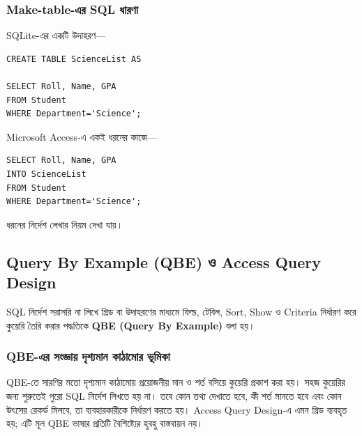 \subsubsection{Make-table-এর SQL ধারণা}

SQLite-এর একটি উদাহরণ—

\par\noindent\begin{minipage}{\linewidth}
\begin{verbatim}
CREATE TABLE ScienceList AS

SELECT Roll, Name, GPA
FROM Student
WHERE Department='Science';
\end{verbatim}
\end{minipage}\par

Microsoft Access-এ একই ধরনের কাজে—

\par\noindent\begin{minipage}{\linewidth}
\begin{verbatim}
SELECT Roll, Name, GPA
INTO ScienceList
FROM Student
WHERE Department='Science';
\end{verbatim}
\end{minipage}\par

ধরনের নির্দেশ লেখার নিয়ম দেখা যায়।

\subsection{Query By Example (QBE) ও Access Query Design}

\begin{definitionbox}{}

SQL নির্দেশ সরাসরি না লিখে গ্রিড বা উদাহরণের মাধ্যমে
ফিল্ড, টেবিল, Sort, Show ও Criteria নির্ধারণ করে কুয়েরি তৈরি করার
পদ্ধতিকে \textbf{QBE (Query By Example)} বলা হয়।

\end{definitionbox}

\subsubsection{QBE-এর সংজ্ঞায় দৃশ্যমান কাঠামোর ভূমিকা}
QBE-তে সারণির মতো দৃশ্যমান কাঠামোয় প্রয়োজনীয় মান ও শর্ত বসিয়ে কুয়েরি প্রকাশ করা হয়। সহজ কুয়েরির জন্য শুরুতেই পুরো SQL নির্দেশ লিখতে হয় না। তবে কোন তথ্য দেখাতে হবে, কী শর্ত মানতে হবে এবং কোন উৎসের রেকর্ড মিলবে, তা ব্যবহারকারীকে নির্ধারণ করতে হয়। Access Query Design-এ এমন গ্রিড ব্যবহৃত হয়; এটি মূল QBE ভাষার প্রতিটি বৈশিষ্ট্যের হুবহু বাস্তবায়ন নয়।


